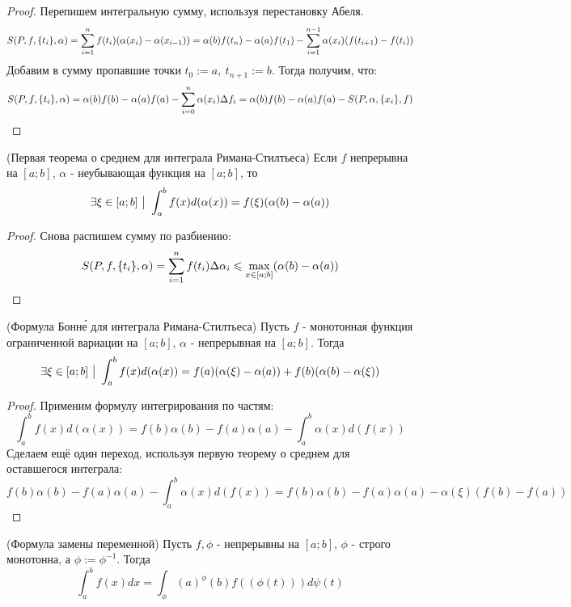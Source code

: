 \begin{proof}
	Перепишем интегральную сумму, используя перестановку Абеля.
	\[
		S(P, f, \{t_i\}, \alpha) = \sum\limits_{i=  1}^nf(t_i)(\alpha(x_i) - \alpha(x_{i - 1})) = \alpha(b)f(t_n) - \alpha(a)f(t_1) - \sum\limits_{i = 1}^{n - 1}\alpha(x_i)(f(t_{i + 1}) - f(t_i))
	\]
	Добавим в сумму пропавшие точки $t_0 := a,\  t_{n + 1} := b$.
	Тогда получим, что:
	\[
		S(P, f, \{t_i\}, \alpha)  = \alpha(b)f(b) - \alpha(a)f(a) - \sum\limits_{i = 0}^n\alpha(x_i)\Delta f_i = \alpha(b)f(b) - \alpha(a)f(a) - S(P, \alpha, \{x_i\}, f)
	\]
\end{proof}

\begin{theorem} (Первая теорема о среднем для интеграла Римана-Стилтьеса)
	Если $f$ непрерывна на $[a; b]$, $\alpha$ - неубывающая функция на $[a; b]$, то
	\[
		\exists \xi \in [a; b] \ \big|\  \int_a^b f(x) d(\alpha(x)) = f(\xi)(\alpha(b) - \alpha(a))
	\]
\end{theorem}

\begin{proof}
	Снова распишем сумму по разбиению:
	\[
		S(P, f, \{t_i\}, \alpha) = \sum\limits_{i = 1}^n f(t_i) \Delta \alpha_i \leqslant \max\limits_{x \in [a; b]} (\alpha(b) - \alpha(a))
	\]
\end{proof}

\begin{theorem} (Формула Бонн\'{е} для интеграла Римана-Стилтьеса)
	Пусть $f$ - монотонная функция ограниченной вариации на $[a; b]$, $\alpha$ - непрерывная на $[a; b]$. Тогда
	\[
		\exists \xi \in [a; b] \ \big|\  \int_a^b f(x) d(\alpha(x)) = f(a)(\alpha(\xi) - \alpha(a)) + f(b)(\alpha(b) - \alpha(\xi))
	\]
\end{theorem}

\begin{proof}
	Применим формулу интегрирования по частям:
	\[
		\int_a^b f(x) d(\alpha(x)) = f(b)\alpha(b) - f(a)\alpha(a) - \int_a^b \alpha(x) d(f(x))
	\]
	Сделаем ещё один переход, используя первую теорему о среднем для оставшегося интеграла:
	\[
		f(b)\alpha(b) - f(a)\alpha(a) - \int_a^b \alpha(x) d(f(x)) = f(b)\alpha(b) - f(a)\alpha(a) - \alpha(\xi)(f(b) - f(a))
	\]
\end{proof}

\begin{theorem} (Формула замены переменной)
	Пусть $f, \phi$ - непрерывны на $[a; b]$, $\phi$ - строго монотонна, а $\phi := \phi^{-1}$. Тогда
	\[
		\int_a^b f(x)dx = \int_\phi(a)^\phi(b) f((\phi(t))) d\psi(t)
	\]
\end{theorem}

